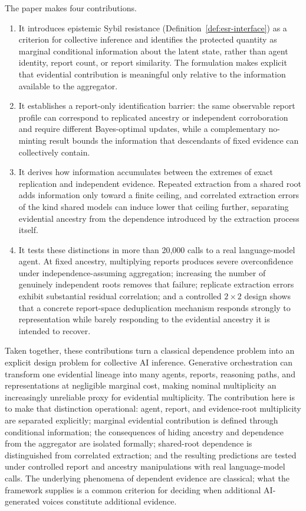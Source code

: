 \documentclass[11pt]{article}
\theoremstyle{definition}
\begin{document}
The paper makes four contributions.
\begin{enumerate}
\item It introduces epistemic Sybil resistance (Definition~\ref{def:esr-interface}) as a criterion for collective inference and identifies the protected quantity as marginal conditional information about the latent state, rather than agent identity, report count, or report similarity. The formulation makes explicit that evidential contribution is meaningful only relative to the information available to the aggregator.
\item It establishes a report-only identification barrier: the same observable report profile can correspond to replicated ancestry or independent corroboration and require different Bayes-optimal updates, while a complementary no-minting result bounds the information that descendants of fixed evidence can collectively contain.
\item It derives how information accumulates between the extremes of exact replication and independent evidence. Repeated extraction from a shared root adds information only toward a finite ceiling, and correlated extraction errors of the kind shared models can induce lower that ceiling further, separating evidential ancestry from the dependence introduced by the extraction process itself.
\item It tests these distinctions in more than 20,000 calls to a real language-model agent. At fixed ancestry, multiplying reports produces severe overconfidence under independence-assuming aggregation; increasing the number of genuinely independent roots removes that failure; replicate extraction errors exhibit substantial residual correlation; and a controlled $2\times2$ design shows that a concrete report-space deduplication mechanism responds strongly to representation while barely responding to the evidential ancestry it is intended to recover.
\end{enumerate}

Taken together, these contributions turn a classical dependence problem into an explicit design problem for collective AI inference. Generative orchestration can transform one evidential lineage into many agents, reports, reasoning paths, and representations at negligible marginal cost, making nominal multiplicity an increasingly unreliable proxy for evidential multiplicity. The contribution here is to make that distinction operational: agent, report, and evidence-root multiplicity are separated explicitly; marginal evidential contribution is defined through conditional information; the consequences of hiding ancestry and dependence from the aggregator are isolated formally; shared-root dependence is distinguished from correlated extraction; and the resulting predictions are tested under controlled report and ancestry manipulations with real language-model calls. The underlying phenomena of dependent evidence are classical; what the framework supplies is a common criterion for deciding when additional AI-generated voices constitute additional evidence.
\end{document}

